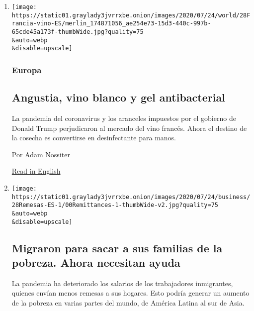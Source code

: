 \begin{enumerate}
\def\labelenumi{\arabic{enumi}.}
\item
  \href{/es/2020/07/28/espanol/mundo/vino-blanco-alsacia-coronavirus.html}{}

  \texttt{[image: https://static01.graylady3jvrrxbe.onion/images/2020/07/24/world/28Francia-vino-ES/merlin\_174871056\_ae254e73-15d3-440c-997b-65cde45a173f-thumbWide.jpg?quality=75\\\&auto=webp\\\&disable=upscale]}

  \hypertarget{europa-2}{%
  \subsubsection{Europa}\label{europa-2}}

  \hypertarget{angustia-vino-blanco-y-gel-antibacterial}{%
  \subsection{Angustia, vino blanco y gel
  antibacterial}\label{angustia-vino-blanco-y-gel-antibacterial}}

  La pandemia del coronavirus y los aranceles impuestos por el gobierno
  de Donald Trump perjudicaron al mercado del vino francés. Ahora el
  destino de la cosecha es convertirse en desinfectante para manos.

  Por Adam Nossiter

  \href{https://www.nytimes3xbfgragh.onion/2020/07/27/world/europe/france-alsace-wine-coronavirus.html}{Read
  in English}
\item
  \href{/es/2020/07/28/espanol/mundo/remesas-coronavirus.html}{}

  \texttt{[image: https://static01.graylady3jvrrxbe.onion/images/2020/07/24/business/28Remesas-ES-1/00Remittances-1-thumbWide-v2.jpg?quality=75\\\&auto=webp\\\&disable=upscale]}

  \hypertarget{migraron-para-sacar-a-sus-familias-de-la-pobreza-ahora-necesitan-ayuda}{%
  \subsection{Migraron para sacar a sus familias de la pobreza. Ahora
  necesitan
  ayuda}\label{migraron-para-sacar-a-sus-familias-de-la-pobreza-ahora-necesitan-ayuda}}

  La pandemia ha deteriorado los salarios de los trabajadores
  inmigrantes, quienes envían menos remesas a sus hogares. Esto podría
  generar un aumento de la pobreza en varias partes del mundo, de
  América Latina al sur de Asia.


\end{enumerate}
